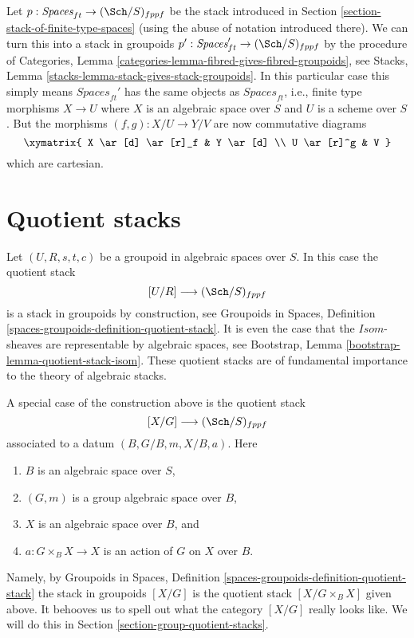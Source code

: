 \noindent
Let $p : \textit{Spaces}_{ft} \to (\Sch/S)_{fppf}$ be the stack
introduced in
Section \ref{section-stack-of-finite-type-spaces}
(using the abuse of notation introduced there).
We can turn this into a stack in groupoids
$p' : \textit{Spaces}_{ft}' \to (\Sch/S)_{fppf}$ by
the procedure of
Categories, Lemma \ref{categories-lemma-fibred-gives-fibred-groupoids},
see
Stacks, Lemma \ref{stacks-lemma-stack-gives-stack-groupoids}.
In this particular case this simply means $\textit{Spaces}_{ft}'$
has the same objects as $\textit{Spaces}_{ft}$, i.e., finite type morphisms
$X \to U$ where $X$ is an algebraic space over $S$ and $U$ is a scheme
over $S$. But the morphisms $(f, g) : X/U \to Y/V$ are now
commutative diagrams
$$
\xymatrix{
X \ar[d] \ar[r]_f & Y \ar[d] \\
U \ar[r]^g & V
}
$$
which are cartesian.



\section{Quotient stacks}
\label{section-quotient-stacks}

\noindent
Let $(U, R, s, t, c)$ be a groupoid in algebraic spaces over $S$.
In this case the quotient stack
$$
[U/R] \longrightarrow (\Sch/S)_{fppf}
$$
is a stack in groupoids by construction, see
Groupoids in Spaces,
Definition \ref{spaces-groupoids-definition-quotient-stack}.
It is even the case that the $\mathit{Isom}$-sheaves are
representable by algebraic spaces, see
Bootstrap, Lemma \ref{bootstrap-lemma-quotient-stack-isom}.
These quotient stacks are of fundamental importance to the theory of
algebraic stacks.

\medskip\noindent
A special case of the construction above is the quotient stack
$$
[X/G] \longrightarrow (\Sch/S)_{fppf}
$$
associated to a datum $(B, G/B, m, X/B, a)$. Here
\begin{enumerate}
\item $B$ is an algebraic space over $S$,
\item $(G, m)$ is a group algebraic space over $B$,
\item $X$ is an algebraic space over $B$, and
\item $a : G \times_B X \to X$ is an action of $G$ on $X$ over $B$.
\end{enumerate}
Namely, by
Groupoids in Spaces,
Definition \ref{spaces-groupoids-definition-quotient-stack}
the stack in groupoids $[X/G]$ is the
quotient stack $[X/G \times_B X]$ given above. It behooves us to
spell out what the category $[X/G]$ really looks like. We will do this in
Section \ref{section-group-quotient-stacks}.



